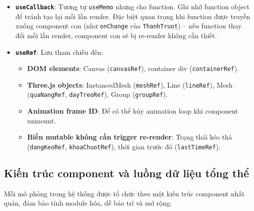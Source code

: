 \begin{itemize}
    \item \textbf{\texttt{useCallback}}: Tương tự \texttt{useMemo} nhưng cho function. Ghi nhớ function object để tránh tạo lại mỗi lần render. Đặc biệt quan trọng khi function được truyền xuống component con (như \texttt{onChange} của \texttt{ThanhTruot}) – nếu function thay đổi mỗi lần render, component con sẽ bị re-render không cần thiết.
    
    \item \textbf{\texttt{useRef}}: Lưu tham chiếu đến:
    \begin{itemize}
        \item \textbf{DOM elements}: Canvas (\texttt{canvasRef}), container div (\texttt{containerRef}).
        \item \textbf{Three.js objects}: InstancedMesh (\texttt{meshRef}), Line (\texttt{lineRef}), Mesh (\texttt{quaNangRef}, \texttt{dayTreoRef}), Group (\texttt{groupRef}).
        \item \textbf{Animation frame ID}: Để có thể hủy animation loop khi component unmount.
        \item \textbf{Biến mutable không cần trigger re-render}: Trạng thái kéo thả (\texttt{dangKeoRef}, \texttt{khoaChuotRef}), thời gian trước đó (\texttt{lastTimeRef}).
    \end{itemize}
\end{itemize}

\subsection{Kiến trúc component và luồng dữ liệu tổng thể}

Mỗi mô phỏng trong hệ thống được tổ chức theo một kiến trúc component nhất quán, đảm bảo tính module hóa, dễ bảo trì và mở rộng:

